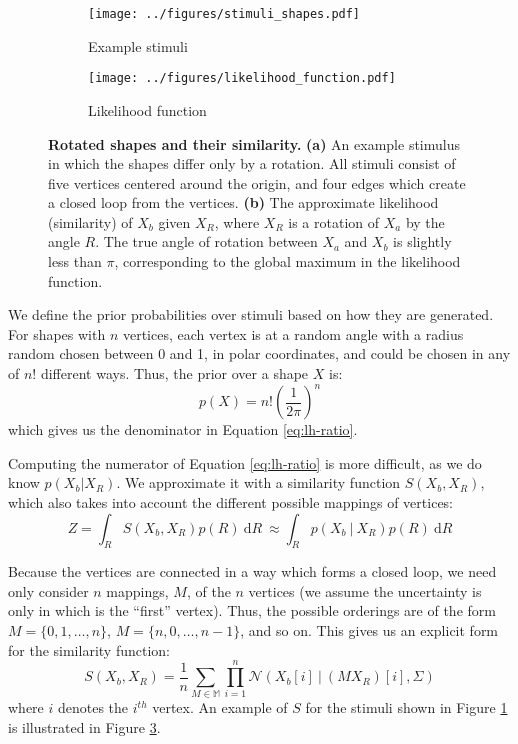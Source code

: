 \documentclass{article} %
\begin{document}
\begin{figure}[t]
  \centering
  \begin{subfigure}[b]{0.45\textwidth}
    \centering
    \texttt{[image: ../figures/stimuli\_shapes.pdf]}
    \vspace{0pt}
    \caption{Example stimuli}
    \label{fig:stimuli}
  \end{subfigure}
  \begin{subfigure}[b]{0.45\textwidth}
    \centering
    \texttt{[image: ../figures/likelihood\_function.pdf]}
    \caption{Likelihood function}
    \label{fig:likelihood}
  \end{subfigure}
  \caption{\textbf{Rotated shapes and their similarity.}  \textbf{(a)}
    An example stimulus in which the shapes differ only by a
    rotation. All stimuli consist of five vertices centered around the
    origin, and four edges which create a closed loop from the
    vertices. \textbf{(b)} The approximate likelihood (similarity) of
    $X_b$ given $X_R$, where $X_R$ is a rotation of $X_a$ by the angle
    $R$. The true angle of rotation between $X_a$ and $X_b$ is
    slightly less than $\pi$, corresponding to the global maximum in
    the likelihood function.}
\end{figure}

We define the prior probabilities over stimuli based on how they are
generated. For shapes with $n$ vertices, each vertex is at a random
angle with a radius random chosen between 0 and 1, in polar
coordinates, and could be chosen in any of $n!$ different ways. Thus,
the prior over a shape $X$ is:
\begin{equation}
  p(X)=n!\left(\frac{1}{2\pi}\right)^n
  \label{eq:prior}
\end{equation} 
which gives us the denominator in Equation \ref{eq:lh-ratio}. 

Computing the numerator of Equation \ref{eq:lh-ratio} is more
difficult, as we do know $p(X_b\vert X_R)$. We approximate it with a
similarity function $S(X_b, X_R)$, which also takes into account the
different possible mappings of vertices:
\begin{equation}
  Z=\int_R S(X_b, X_R)p(R)\ \mathrm{d}R\ \approx\int_Rp(X_b\ \vert\ X_R)p(R)\ \mathrm{d}R
  \label{eq:Z}
\end{equation}

Because the vertices are connected in a way which forms a closed loop,
we need only consider $n$ mappings, $M$, of the $n$ vertices (we
assume the uncertainty is only in which is the ``first''
vertex). Thus, the possible orderings are of the form $M=\lbrace{}0,
1, \ldots{}, n\rbrace{}$, $M=\lbrace{}n, 0, \ldots{}, n-1\rbrace{}$,
and so on. This gives us an explicit form for the similarity function:
\begin{equation}
  S(X_b, X_R)=\frac{1}{n}\sum_{M\in\mathbb{M}}\prod_{i=1}^n\mathcal{N}(X_b[i]\ \vert \ (MX_R)[i], \Sigma)
  \label{eq:similarity}
\end{equation}
where $i$ denotes the $i^{th}$ vertex. An example of $S$ for the
stimuli shown in Figure \ref{fig:stimuli} is illustrated in Figure
\ref{fig:likelihood}.
\end{document}
